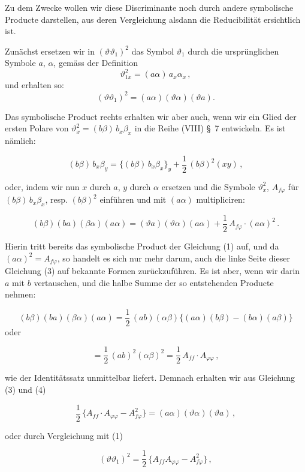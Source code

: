 \documentclass[11pt]{article}
\providecommand{\weberpage}[1]{}
\providecommand{\weq}[2]{\begin{equation}\tag{#1}#2\end{equation}}
\begin{document}
Zu dem Zwecke wollen wir diese Discriminante noch durch andere symbolische Producte darstellen, aus deren Vergleichung alsdann die Reducibilität ersichtlich ist.

Zunächst ersetzen wir in $(\vartheta\vartheta_1)^2$ das Symbol $\vartheta_1$ durch die ursprünglichen Symbole $a$, $\alpha$, gemäss der Definition
\[
\vartheta_{1x}^2 = (a\alpha)\,a_x \alpha_x\,,
\]
und erhalten so:
\weq{1}{(\vartheta\vartheta_1)^2 = (a\alpha)(\vartheta\alpha)(\vartheta a).}


\weberpage{141}

Das symbolische Product rechts erhalten wir aber auch, wenn wir
ein Glied der ersten Polare von $\vartheta_x^2 = (b\beta)\,b_x\beta_x$ in die Reihe (VIII)
\S~7 entwickeln. Es ist nämlich:

\weq{2}{(b\beta)\,b_x\beta_y = \{(b\beta)\,b_x\beta_x\}_y + \frac{1}{2}\,(b\beta)^2(xy)\,,}

oder, indem wir nun $x$ durch $a$, $y$ durch $\alpha$ ersetzen und die Symbole
$\vartheta_x^2$, $A_{f\varphi}$ für $(b\beta)\,b_x\beta_x$, resp. $(b\beta)^2$ einführen und mit $(a\alpha)$
multipliciren:

\weq{3}{(b\beta)(ba)(\beta\alpha)(a\alpha) = (\vartheta a)(\vartheta\alpha)(a\alpha) + \frac{1}{2}\,A_{f\varphi}\cdot(a\alpha)^2\,.}

Hierin tritt bereits das symbolische Product der Gleichung (1)
auf, und da $(a\alpha)^2 = A_{f\varphi}$, so handelt es sich nur mehr darum, auch
die linke Seite dieser Gleichung (3) auf bekannte Formen zurückzuführen. Es ist aber, wenn wir darin $a$ mit $b$ vertauschen, und die
halbe Summe der so entstehenden Producte nehmen:

\[
(b\beta)(ba)(\beta\alpha)(a\alpha) = \frac{1}{2}\,(ab)(\alpha\beta)\{(a\alpha)(b\beta) - (b\alpha)(a\beta)\}
\]
oder

\weq{4}{= \frac{1}{2}\,(ab)^2(\alpha\beta)^2 = \frac{1}{2}\,A_{ff}\cdot A_{\varphi\varphi}\,,}

wie der Identitätssatz unmittelbar liefert. Demnach erhalten wir aus
Gleichung (3) und (4)

\weq{5}{\frac{1}{2}\,\{A_{ff}\cdot A_{\varphi\varphi} - A_{f\varphi}^2\} = (a\alpha)(\vartheta\alpha)(\vartheta a)\,,}

oder durch Vergleichung mit (1)

\weq{6}{(\vartheta\vartheta_1)^2 = \frac{1}{2}\,\{A_{ff}A_{\varphi\varphi} - A_{f\varphi}^2\}\,,}
\end{document}
